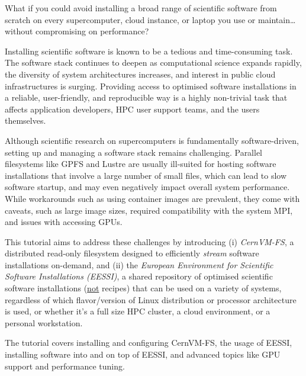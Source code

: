 What if you could avoid installing a broad range of scientific software from scratch on every
supercomputer, cloud instance, or laptop you use or maintain\ldots without compromising on performance?

Installing scientific software is known to be a tedious and time-consuming task. The software stack
continues to deepen as computational science expands rapidly, the diversity of system architectures
increases, and interest in public cloud infrastructures is surging.
Providing access to optimised software installations in a reliable, user-friendly, and reproducible way
is a highly non-trivial task that affects application developers, HPC user support teams, and the users themselves.

Although scientific research on supercomputers is fundamentally software-driven,
setting up and managing a software stack remains challenging.
Parallel filesystems like GPFS and Lustre are usually ill-suited for hosting software installations
that involve a large number of small files, which can lead to slow software startup, and may even negatively impact
overall system performance.
While workarounds such as using container images are prevalent, they come with caveats,
such as large image sizes, required compatibility with the system MPI,
and issues with accessing GPUs.

This tutorial aims to address these challenges by introducing (i) \emph{CernVM-FS},
a distributed read-only filesystem designed to efficiently \emph{stream} software installations on-demand,
and (ii) the \emph{European Environment for Scientific Software Installations (EESSI)},
a shared repository of optimised scientific software installations (\underline{not} recipes) that can be used on a variety of
systems, regardless of which flavor/version of Linux distribution or processor architecture is used, or whether it's a full size HPC
cluster, a cloud environment, or a personal workstation.

The tutorial covers installing and configuring CernVM-FS, the usage of EESSI,
installing software into and on top of EESSI, and advanced topics like GPU support and performance tuning.
